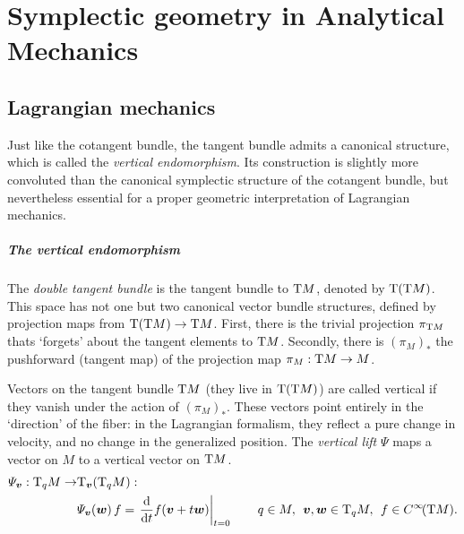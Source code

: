 \chapter{Symplectic geometry in Analytical Mechanics}
\label{app:symplectic_geometry}

\section{Lagrangian mechanics}
Just like the cotangent bundle, the tangent bundle admits a canonical structure, which is called the \emph{vertical endomorphism}. Its construction is slightly more convoluted than the canonical symplectic structure of the cotangent bundle, but nevertheless essential for a proper geometric interpretation of Lagrangian mechanics. 

\paragraph{The vertical endomorphism} The \emph{double tangent bundle} is the tangent bundle to $\mathrm{T}M$, denoted by $\mathrm{T}(\mathrm{T}M)$. This space has not one but two canonical vector bundle structures, defined by projection maps from $\mathrm{T}(\mathrm{T}M) \to \mathrm{T}M$. First, there is the trivial projection $\pi_{\mathrm{T}M}$ thats `forgets' about the tangent elements to $\mathrm{T}M$. Secondly, there is $ (\pi_{M})_* $ the pushforward (tangent map) of the projection map $\pi_M: \mathrm{T}M \to M$. \cite{Abraham1978}
\begin{center}
\end{center}
Vectors on the tangent bundle $\mathrm{T}M$ (they live in $\mathrm{T}(\mathrm{T}M)$) are called vertical if they vanish under the action of $ (\pi_M)_* $. These vectors point entirely in the `direction' of the fiber: in the Lagrangian formalism, they reflect a pure change in velocity, and no change in the generalized position. The \emph{vertical lift} $\Psi$ maps a vector on $M$ to a vertical vector on $\mathrm{T}M$. \cite{Carinena1990}
\begin{equation}
    \begin{split}
        \Psi_{\vec{v}}: \tspace{q}{M} \to & \tspace{\vec{v}}{\qty(\tspace{q}{M})}: \\ 
        & \Psi_{\vec{v}}(\vec{w})\,f = \left. \dv{}{t} f(\vec{v} + t\vec{w})\right |_{t = 0}
        \qquad q \in M,\:\: \vec{v},\vec{w}\in \tspace{q}{M},\:\: f \in \functions{\tbundle{M}}.
    \end{split}
\end{equation}
